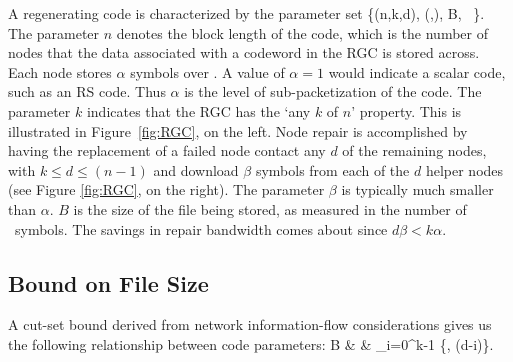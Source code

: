 \begin{multicols}{2}
	A regenerating code is characterized by the parameter set
	\bean
	\{(n,k,d), (\alpha,\beta), B, \fq\ \}.
	\eean
	The parameter $n$ denotes the block length of the code, which is the number of nodes that the data associated with a codeword in the RGC is stored across. Each node stores $\alpha$ symbols over \fq.  A value of $\alpha=1$ would indicate a scalar code, such as an RS code.  Thus $\alpha$ is the level of sub-packetization of the code. The parameter $k$ indicates that the RGC has the `any $k$ of $n$' property.  This is illustrated in Figure~\ref{fig:RGC}, on the left. Node repair is accomplished by having the replacement of a failed node contact any $d$ of the remaining nodes, with $k \leq d \leq (n-1)$ and download $\beta$ symbols from each of the $d$ helper nodes (see Figure \ref{fig:RGC}, on the right).  The parameter $\beta$ is typically much smaller than $\alpha$.  $B$ is the size of the file being stored, as measured in the number of \fq\ symbols.  The savings in repair bandwidth comes about since $d \beta < k \alpha $.

	\subsection{Bound on File Size} 
	
	A cut-set bound derived from network information-flow considerations \cite{AhlCaiLiYeu} gives us the following relationship \cite{DimGodWuWaiRam} between code parameters: 
	\bean
	B & \leq & \sum_{i=0}^{k-1} \min\{\alpha, (d-i)\beta\}. 
	\eean	
 \end{multicols}

